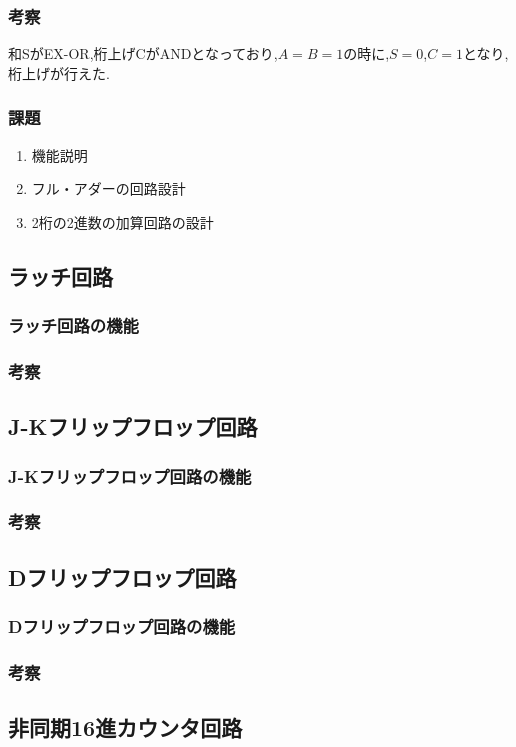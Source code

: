 \documentclass[twocolumn, 10pt,a4j]{jsarticle}
\begin{document}
  \subsubsection{考察}
    和SがEX-OR,桁上げCがANDとなっており,$A=B=1$の時に,$S=0$,$C=1$となり,
    桁上げが行えた.
  \subsubsection{課題}
    \begin{enumerate}
    \item 機能説明
    \item フル・アダーの回路設計
    \item 2桁の2進数の加算回路の設計
    \end{enumerate}
\subsection{ラッチ回路}
  \subsubsection{ラッチ回路の機能}
  \subsubsection{考察}
\subsection{J-Kフリップフロップ回路}
  \subsubsection{J-Kフリップフロップ回路の機能}
  \subsubsection{考察}
\subsection{Dフリップフロップ回路}
  \subsubsection{Dフリップフロップ回路の機能}
  \subsubsection{考察}
\subsection{非同期16進カウンタ回路}
\end{document}
